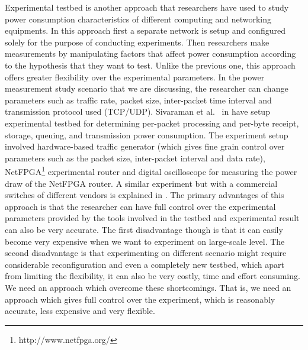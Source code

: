 Experimental testbed is another approach that researchers have used to study power consumption characteristics of different computing and networking equipments. In this approach first a separate network is setup and configured solely for the purpose of conducting experiments. Then researchers make measurements by manipulating factors that affect power consumption according to the hypothesis that they want to test. Unlike the previous one, this approach offers greater flexibility over the experimental parameters. In the power measurement study scenario that we are discussing, the researcher can change parameters such as traffic rate, packet size, inter-packet time interval and transmission protocol used (TCP/UDP). Sivaraman et al.{\ } in \cite{Sivaraman} have setup experimental testbed for determining per-packet processing and per-byte receipt, storage, queuing, and transmission power consumption. The experiment setup involved hardware-based traffic generator (which gives fine grain control over parameters such as the packet size, inter-packet interval and data rate), NetFPGA\footnote{http://www.netfpga.org/} experimental router and digital oscilloscope for measuring the power draw of the NetFPGA router. A similar experiment but with a commercial switches of different vendors is explained in \cite{DBLP:journals/comcom/SivaramanRZSVMR14}. The primary advantages of this approach is that the researcher can have full control over the experimental parameters provided by the tools involved in the testbed and experimental result can also be very accurate. The first disadvantage though is that it can easily become very expensive when we want to experiment on large-scale level. The second disadvantage is that experimenting on different scenario might require considerable reconfiguration and even a completely new testbed, which apart from limiting the flexibility, it can also be very costly, time and effort consuming. We need an approach which overcome these shortcomings. That is, we need an approach which gives full control over the experiment, which is reasonably accurate, less expensive and very flexible. 

